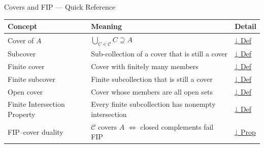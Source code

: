 \begin{toolkitbox}{Covers and FIP — Quick Reference}
\small
\begin{tabular}{l l l}
\toprule
\textbf{Concept} & \textbf{Meaning} & \textbf{Detail} \\
\midrule
Cover of $A$     & $\bigcup_{C \in \mathcal{C}} C \supseteq A$                     & \hyperref[def:cover-full]{↓ Def} \\
Subcover         & Sub-collection of a cover that is still a cover                 & \hyperref[def:subcover]{↓ Def} \\
Finite cover     & Cover with finitely many members                                & \hyperref[def:finite-cover]{↓ Def} \\
Finite subcover  & Finite subcollection that is still a cover                      & \hyperref[def:subcover]{↓ Def} \\
Open cover       & Cover whose members are all open sets                           & \hyperref[def:open-cover]{↓ Def} \\
Finite Intersection Property & Every finite subcollection has nonempty intersection & \hyperref[def:fip]{↓ Def} \\
FIP–cover duality & $\mathcal{C}$ covers $A$ $\iff$ closed complements fail FIP   & \hyperref[prop:fip-duality]{↓ Prop} \\
\bottomrule
\end{tabular}
\end{toolkitbox}


